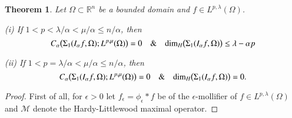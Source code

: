 \documentclass[12pt]{amsart}
\newtheorem{theorem}{Theorem}[section]
\begin{document}
\begin{theorem}\label{t4} Let $\Omega\subset\mathbb R^n$ be a bounded domain and $f\in L^{p,\lambda}(\Omega)$.

\item{\rm(i)} If $1<p<\lambda/\alpha<\mu/\alpha\le n/\alpha$, then
$$
C_\alpha\big(\Sigma_1(I_\alpha f,\Omega);
L^{p,\mu}(\Omega)\big)=0\quad\&\quad
\hbox{dim}_H\big(\Sigma_1(I_\alpha f,\Omega)\big)\le
\lambda-\alpha p
$$

\item{\rm(ii)} If $1<p=\lambda/\alpha<\mu/\alpha\le n/\alpha$, then
$$
C_\alpha\big(\Sigma_1(I_\alpha f,\Omega);
L^{p,\mu}(\Omega)\big)=0\quad\&\quad
\hbox{dim}_H\big(\Sigma_1(I_\alpha f,\Omega)\big)=0.
$$
\end{theorem}
\begin{proof} First of all, for $\epsilon>0$ let $f_\epsilon=\phi_\epsilon\ast f$ be of the $\epsilon$-mollifier of $f\in L^{p,\lambda}(\Omega)$ and $\mathcal{M}$ denote the Hardy-Littlewood maximal operator.


\end{proof}
\end{document}
